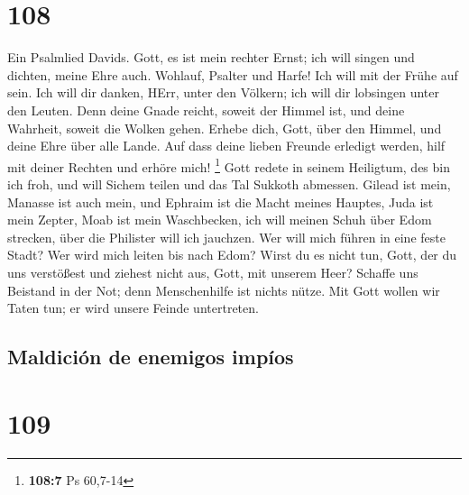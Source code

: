 \hypertarget{section-107}{%
\section{108}\label{section-107}}

 Ein Psalmlied Davids.  Gott, es ist mein
rechter Ernst; ich will singen und dichten, meine Ehre auch.
 Wohlauf, Psalter und Harfe! Ich will mit der Frühe auf
sein.  Ich will dir danken, HErr, unter den Völkern; ich
will dir lobsingen unter den Leuten.  Denn deine Gnade
reicht, soweit der Himmel ist, und deine Wahrheit, soweit die Wolken
gehen.  Erhebe dich, Gott, über den Himmel, und deine Ehre
über alle Lande.  Auf dass deine lieben Freunde erledigt
werden, hilf mit deiner Rechten und erhöre mich! \footnote{\textbf{108:7}
  Ps 60,7-14}  Gott redete in seinem Heiligtum, des bin
ich froh, und will Sichem teilen und das Tal Sukkoth abmessen.
 Gilead ist mein, Manasse ist auch mein, und Ephraim ist
die Macht meines Hauptes, Juda ist mein Zepter,  Moab ist
mein Waschbecken, ich will meinen Schuh über Edom strecken, über die
Philister will ich jauchzen.  Wer will mich führen in
eine feste Stadt? Wer wird mich leiten bis nach Edom? 
Wirst du es nicht tun, Gott, der du uns verstößest und ziehest nicht
aus, Gott, mit unserem Heer?  Schaffe uns Beistand in der
Not; denn Menschenhilfe ist nichts nütze.  Mit Gott
wollen wir Taten tun; er wird unsere Feinde untertreten.

\hypertarget{maldiciuxf3n-de-enemigos-impuxedos}{%
\subsection{Maldición de enemigos
impíos}\label{maldiciuxf3n-de-enemigos-impuxedos}}

\hypertarget{section-108}{%
\section{109}\label{section-108}}


